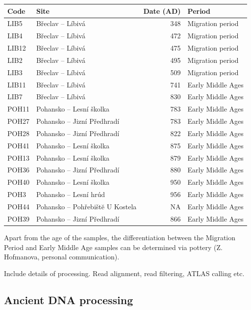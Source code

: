 \begin{tabular}{l|l|r|l}
\hline
Code & Site & Date (AD) & Period\\
\hline
LIB5 & Břeclav – Líbivá & 348 & Migration period\\
\hline
LIB4 & Břeclav – Líbivá & 472 & Migration period\\
\hline
LIB12 & Břeclav – Líbivá & 475 & Migration period\\
\hline
LIB2 & Břeclav – Líbivá & 495 & Migration period\\
\hline
LIB3 & Břeclav – Líbivá & 509 & Migration period\\
\hline
LIB11 & Břeclav – Líbivá & 741 & Early Middle Ages\\
\hline
LIB7 & Břeclav – Líbivá & 830 & Early Middle Ages\\
\hline
POH11 & Pohansko – Lesní školka & 783 & Early Middle Ages\\
\hline
POH27 & Pohansko – Jizní Předhradí & 783 & Early Middle Ages\\
\hline
POH28 & Pohansko – Jizní Předhradí & 822 & Early Middle Ages\\
\hline
POH41 & Pohansko – Lesní školka & 875 & Early Middle Ages\\
\hline
POH13 & Pohansko – Lesní školka & 879 & Early Middle Ages\\
\hline
POH36 & Pohansko – Jizní Předhradí & 880 & Early Middle Ages\\
\hline
POH40 & Pohansko – Lesní školka & 950 & Early Middle Ages\\
\hline
POH3 & Pohansko – Lesní hrúd & 956 & Early Middle Ages\\
\hline
POH44 & Pohansko – Pohřebištĕ U Kostela & NA & Early Middle Ages\\
\hline
POH39 & Pohansko – Jizní Předhradí & 866 & Early Middle Ages\\
\hline
\end{tabular}

Apart from the age of the samples, the differentiation between the Migration Period and Early Middle Age samples can be determined via pottery (Z. Hofmanova, personal communication).  

Include details of processing. Read alignment, read filtering, ATLAS calling etc. 

\subsection{Ancient DNA processing}

